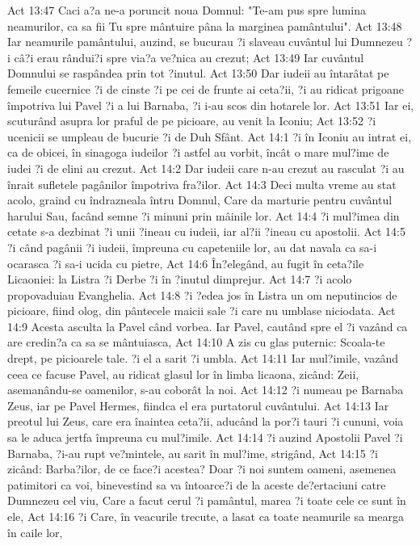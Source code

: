 Act 13:47  Caci a?a ne-a poruncit noua Domnul: "Te-am pus spre lumina neamurilor, ca sa fii Tu spre mântuire pâna la marginea pamântului".
Act 13:48  Iar neamurile pamântului, auzind, se bucurau ?i slaveau cuvântul lui Dumnezeu ?i câ?i erau rândui?i spre via?a ve?nica au crezut;
Act 13:49  Iar cuvântul Domnului se raspândea prin tot ?inutul.
Act 13:50  Dar iudeii au întarâtat pe femeile cucernice ?i de cinste ?i pe cei de frunte ai ceta?ii, ?i au ridicat prigoane împotriva lui Pavel ?i a lui Barnaba, ?i i-au scos din hotarele lor.
Act 13:51  Iar ei, scuturând asupra lor praful de pe picioare, au venit la Iconiu;
Act 13:52  ?i ucenicii se umpleau de bucurie ?i de Duh Sfânt.
Act 14:1  ?i în Iconiu au intrat ei, ca de obicei, în sinagoga iudeilor ?i astfel au vorbit, încât o mare mul?ime de iudei ?i de elini au crezut.
Act 14:2  Dar iudeii care n-au crezut au rasculat ?i au înrait sufletele pagânilor împotriva fra?ilor.
Act 14:3  Deci multa vreme au stat acolo, graind cu îndrazneala întru Domnul, Care da marturie pentru cuvântul harului Sau, facând semne ?i minuni prin mâinile lor.
Act 14:4  ?i mul?imea din cetate s-a dezbinat ?i unii ?ineau cu iudeii, iar al?ii ?ineau cu apostolii.
Act 14:5  ?i când pagânii ?i iudeii, împreuna cu capeteniile lor, au dat navala ca sa-i ocarasca ?i sa-i ucida cu pietre,
Act 14:6  În?elegând, au fugit în ceta?ile Licaoniei: la Listra ?i Derbe ?i în ?inutul dimprejur.
Act 14:7  ?i acolo propovaduiau Evanghelia.
Act 14:8  ?i ?edea jos în Listra un om neputincios de picioare, fiind olog, din pântecele maicii sale ?i care nu umblase niciodata.
Act 14:9  Acesta asculta la Pavel când vorbea. Iar Pavel, cautând spre el ?i vazând ca are credin?a ca sa se mântuiasca,
Act 14:10  A zis cu glas puternic: Scoala-te drept, pe picioarele tale. ?i el a sarit ?i umbla.
Act 14:11  Iar mul?imile, vazând ceea ce facuse Pavel, au ridicat glasul lor în limba licaona, zicând: Zeii, asemanându-se oamenilor, s-au coborât la noi.
Act 14:12  ?i numeau pe Barnaba Zeus, iar pe Pavel Hermes, fiindca el era purtatorul cuvântului.
Act 14:13  Iar preotul lui Zeus, care era înaintea ceta?ii, aducând la por?i tauri ?i cununi, voia sa le aduca jertfa împreuna cu mul?imile.
Act 14:14  ?i auzind Apostolii Pavel ?i Barnaba, ?i-au rupt ve?mintele, au sarit în mul?ime, strigând,
Act 14:15  ?i zicând: Barba?ilor, de ce face?i acestea? Doar ?i noi suntem oameni, asemenea patimitori ca voi, binevestind sa va întoarce?i de la aceste de?ertaciuni catre Dumnezeu cel viu, Care a facut cerul ?i pamântul, marea ?i toate cele ce sunt în ele,
Act 14:16  ?i Care, în veacurile trecute, a lasat ca toate neamurile sa mearga în caile lor,
